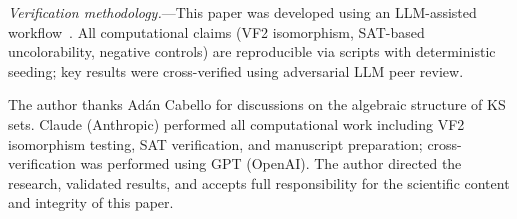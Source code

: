 \documentclass[twocolumn,prl,superscriptaddress,nofootinbib]{revtex4-2}
\begin{document}
\textit{Verification methodology.}---This paper was developed using an LLM-assisted workflow~\cite{Schwartz2026}.  All computational claims (VF2 isomorphism, SAT-based uncolorability, negative controls) are reproducible via scripts with deterministic seeding; key results were cross-verified using adversarial LLM peer review.

\begin{acknowledgments}
The author thanks Ad\'an Cabello for discussions on the algebraic structure of KS sets.  Claude (Anthropic) performed all computational work including VF2 isomorphism testing, SAT verification, and manuscript preparation; cross-verification was performed using GPT (OpenAI).  The author directed the research, validated results, and accepts full responsibility for the scientific content and integrity of this paper.
\end{acknowledgments}
\end{document}

